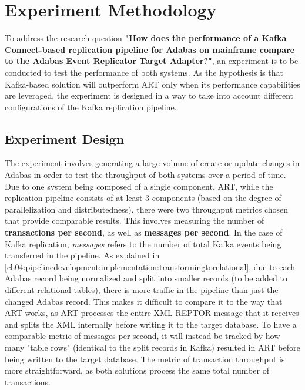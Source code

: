 \chapter{Experiment Methodology}
\label{ch05:methodology}
To address the research question \textbf{"How does the performance of a Kafka Connect-based replication pipeline for Adabas on mainframe compare to the Adabas Event Replicator Target Adapter?"}, an experiment is to be conducted to test the performance of both systems. As the hypothesis is that Kafka-based solution will outperform \ac{ART} only when its performance capabilities are leveraged, the experiment is designed in a way to take into account different configurations of the Kafka replication pipeline.

\section{Experiment Design}
\label{ch05:methodology:design}
The experiment involves generating a large volume of create or update changes in Adabas in order to test the throughput of both systems over a period of time. Due to one system being composed of a single component, \ac{ART}, while the replication pipeline consists of at least 3 components (based on the degree of parallelization and distributedness), there were two throughput metrics chosen that provide comparable results. This involves measuring the number of \textbf{transactions per second}, as well as \textbf{messages per second}. In the case of Kafka replication, \textit{messages} refers to the number of total Kafka events being transferred in the pipeline. As explained in \ref{ch04:pipelinedevelopment:implementation:transformingtorelational}, due to each Adabas record being normalized and split into smaller records (to be added to different relational tables), there is more traffic in the pipeline than just the changed Adabas record. This makes it difficult to compare it to the way that \ac{ART} works, as \ac{ART} processes the entire XML \ac{REPTOR} message that it receives and splits the XML internally before writing it to the target database. To have a comparable metric of messages per second, it will instead be tracked by how many "table rows" (identical to the split records in Kafka) resulted in \ac{ART} before being written to the target database. The metric of transaction throughput is more straightforward, as both solutions process the same total number of transactions.

